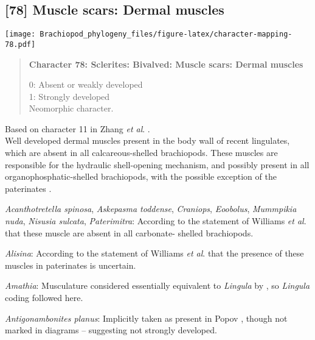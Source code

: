 \documentclass[openany]{book}
\theoremstyle{definition}
\theoremstyle{definition}
\theoremstyle{definition}
\theoremstyle{remark}
\begin{document}
\subsection*{{[}78{]} Muscle scars: Dermal
muscles}\label{muscle-scars-dermal-muscles}

\texttt{[image: Brachiopod\_phylogeny\_files/figure-latex/character-mapping-78.pdf]}

\begin{quote}
\textbf{Character 78: Sclerites: Bivalved: Muscle scars: Dermal muscles}

0: Absent or weakly developed\\
1: Strongly developed\\
Neomorphic character.
\end{quote}

Based on character 11 in Zhang \emph{et al}.
\citeyearpar{Zhang2014Anearly}.\\
Well developed dermal muscles present in the body wall of recent
lingulates, which are absent in all calcareous-shelled brachiopods.
These muscles are responsible for the hydraulic shell-opening mechanism,
and possibly present in all organophosphatic-shelled brachiopods, with
the possible exception of the paterinates
\citep[p.~32]{Williams2000LinguliformeaCraniiformea}.

\hypertarget{Acanthotretella_spinosa-coding-78}{}
\emph{Acanthotretella spinosa}, \emph{Askepasma toddense},
\emph{Craniops}, \emph{Eoobolus}, \emph{Mummpikia nuda}, \emph{Nisusia
sulcata}, \emph{Paterimitra}: According to the statement of Williams
\emph{et al}. \citeyearpar[p.~32]{Williams2000LinguliformeaCraniiformea}
that these muscle are absent in all carbonate- shelled brachiopods.

\hypertarget{Alisina-coding-78}{}
\emph{Alisina}: According to the statement of Williams \emph{et al}.
\citeyearpar[p.~32]{Williams2000LinguliformeaCraniiformea} that the
presence of these muscles in paterinates is uncertain.

\hypertarget{Amathia-coding-78}{}
\emph{Amathia}: Musculature considered essentially equivalent to
\emph{Lingula} by \citet{Williams2000LinguliformeaCraniiformea}, so
\emph{Lingula} coding followed here.

\hypertarget{Antigonambonites_planus-coding-78}{}
\emph{Antigonambonites planus}: Implicitly taken as present in Popov
\citeyearpar{Popov1992TheCambrian}, though not marked in diagrams --
suggesting not strongly developed.
\end{document}
